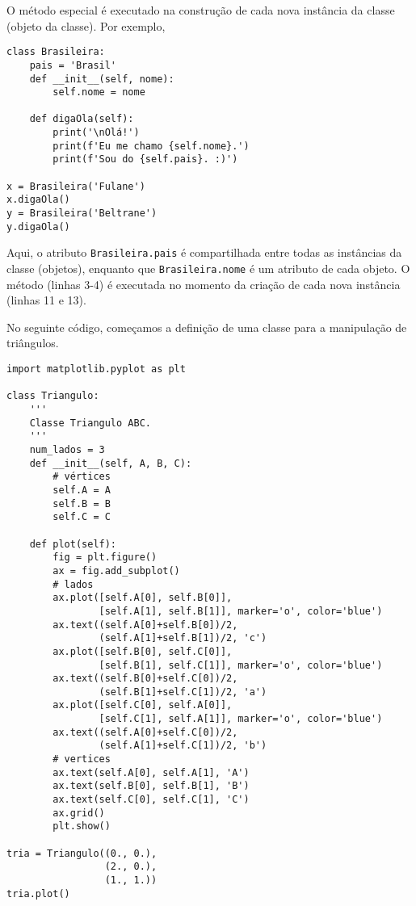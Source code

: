 O método especial {\PYTHONobjectDOTinit} é executado na construção de cada nova instância da classe (objeto da classe). Por exemplo,

\begin{lstlisting}
class Brasileira:
    pais = 'Brasil'
    def __init__(self, nome):
        self.nome = nome
        
    def digaOla(self):
        print('\nOlá!')
        print(f'Eu me chamo {self.nome}.')
        print(f'Sou do {self.pais}. :)')

x = Brasileira('Fulane')
x.digaOla()
y = Brasileira('Beltrane')
y.digaOla()
\end{lstlisting}

Aqui, o atributo \lstinline+Brasileira.pais+ é compartilhada entre todas as instâncias da classe (objetos), enquanto que \lstinline+Brasileira.nome+ é um atributo de cada objeto. O método {\PYTHONobjectDOTinit} (linhas 3-4) é executada no momento da criação de cada nova instância (linhas 11 e 13).

\begin{ex}\label{cap_oo_sec_class:ex:triangulo}
  No seguinte código, começamos a definição de uma classe para a manipulação de triângulos.

\begin{lstlisting}[caption=classTriangulo.py, label=cap_poo_sec_class:cod:classTriangulo]
import matplotlib.pyplot as plt

class Triangulo:
    '''
    Classe Triangulo ABC.
    '''
    num_lados = 3
    def __init__(self, A, B, C):
        # vértices
        self.A = A
        self.B = B
        self.C = C

    def plot(self):
        fig = plt.figure()
        ax = fig.add_subplot()
        # lados
        ax.plot([self.A[0], self.B[0]],
                [self.A[1], self.B[1]], marker='o', color='blue')
        ax.text((self.A[0]+self.B[0])/2,
                (self.A[1]+self.B[1])/2, 'c')
        ax.plot([self.B[0], self.C[0]],
                [self.B[1], self.C[1]], marker='o', color='blue')
        ax.text((self.B[0]+self.C[0])/2,
                (self.B[1]+self.C[1])/2, 'a')
        ax.plot([self.C[0], self.A[0]],
                [self.C[1], self.A[1]], marker='o', color='blue')
        ax.text((self.A[0]+self.C[0])/2,
                (self.A[1]+self.C[1])/2, 'b')
        # vertices
        ax.text(self.A[0], self.A[1], 'A')
        ax.text(self.B[0], self.B[1], 'B')
        ax.text(self.C[0], self.C[1], 'C')
        ax.grid()
        plt.show()

tria = Triangulo((0., 0.),
                 (2., 0.),
                 (1., 1.))
tria.plot()
\end{lstlisting}

\end{ex}

